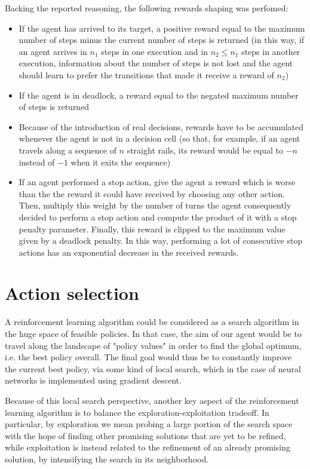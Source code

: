 \documentclass[a4paper,10pt]{report}
\begin{document}
Backing the reported reasoning, the following rewards shaping was perfomed:
\begin{itemize}
	\item If the agent has arrived to its target, a positive reward equal to the maximum number of steps minus the current number of steps is returned (in this way, if an agent arrives in $n_1$ steps in one execution and in $n_2\le n_1$ steps in another execution, information about the number of steps is not lost and the agent should learn to prefer the transitions that made it receive a reward of $n_2$)
	\item If the agent is in deadlock, a reward equal to the negated maximum number of steps is returned
	\item Because of the introduction of real decisions, rewards have to be accumulated whenever the agent is not in a decision cell (so that, for example, if an agent travels along a sequence of $n$ straight rails, its reward would be equal to $-n$ instead of $-1$ when it exits the sequence)
	\item If an agent performed a stop action, give the agent a reward which is worse than the the reward it could have received by choosing any other action. Then, multiply this weight by the number of turns the agent consequently decided to perform a stop action and compute the product of it with a stop penalty parameter. Finally, this reward is clipped to the maximum value given by a deadlock penalty. In this way, performing a lot of consecutive stop actions has an exponential decrease in the received rewards.
\end{itemize}

\section{Action selection}\label{sec:action-selection}
A reinforcement learning algorithm could be considered as a search algorithm in the huge space of feasible policies. In that case, the aim of our agent would be to travel along the landscape of "policy values" in order to find the global optimum, i.e. the best policy overall. The final goal would thus be to constantly improve the current best policy, via some kind of local search, which in the case of neural networks is implemented using gradient descent.

Because of this local search perspective, another key aspect of the reinforcement learning algorithm is to balance the exploration-exploitation tradeoff. In particular, by exploration we mean probing a large portion of the search space with the hope of finding other promising solutions that are yet to be refined, while exploitation is instead related to the refinement of an already promising solution, by intensifying the search in its neighborhood.
\end{document}
